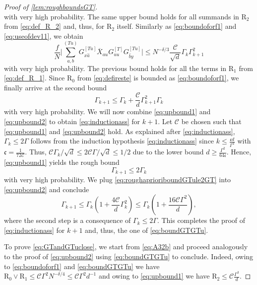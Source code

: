 \documentclass[11pt]{article}
\theoremstyle{plain}
\theoremstyle{remark}
\numberwithin{equation}{section}
\newcommand*\barr[1]{\overline{#1}}
\newcommand*\bset[1]{[#1]}
\newcommand*\ubarr[1]{{\widehat{#1}}}
\begin{document}
\begin{proof}[Proof of \cref{lem:roughboundsGT}]
\begin{equation}
		\end{equation}
		with very high probability. The same upper bound holds for all summands in $\mathrm{R}_2$ from \cref{eq:def_R_2} and, thus, for $\mathrm{R}_2$ itself.  
		Similarly as \cref{eq:boundoforf1} and \cref{eq:useofdev11}, we obtain 
		\begin{equation}\label{eq:upboundforf2}
			\frac{f}{N}\biggl| \sum_{a,b}^{(Tu)} G_{x\ubarr{a}}^{\bset{Tu}} \barr{X}_{au} G_{uu}^{\bset{T}} G_{\ubarr{b}y}^{\bset{Tu}} \biggr| \le N^{- \delta/ 3 }\frac{\mathcal{C}}{\sqrt{d}} \Gamma_k \Gamma_{k+1}^{2}
		\end{equation}
		with very high probability. 
		The previous bound holds for all the terms in $\mathrm{R}_1$ from \cref{eq:def_R_1}. 
		Since $\mathrm{R}_0$ from \cref{eq:defireste} is bounded as \cref{eq:boundoforf1}, 
		we finally arrive at the second bound 
		\begin{equation}\label{eq:upbound2}
			\Gamma_{k+1} \le \Gamma_{k} + \frac{\mathcal{C}}{d} \Gamma_{k+1}^2 \Gamma_k
		\end{equation}
		with very high probability. 
		We will now combine \cref{eq:upbound1} and \cref{eq:upbound2} to obtain \cref{eq:inductionass} for $k + 1$. Let $\mathcal C$ be chosen such that \cref{eq:upbound1} and \cref{eq:upbound2} hold. As explained after \cref{eq:inductionass}, $\Gamma_k \leq  2 \Gamma$ follows from the induction hypothesis \cref{eq:inductionass} since $ k \le \frac{\mathfrak{c} d}{\Gamma^2}$ with $\mathfrak c = \frac{1}{72 \mathcal C}$. 
		Thus, $\mathcal{C}\Gamma_k/\sqrt{d} \le 2\mathcal{C}\Gamma/ \sqrt{d}\le 1/2$ due to the lower bound $d \geq \frac{\Gamma^2}{64\mathfrak c}$. Hence, \cref{eq:upbound1} yields the rough bound 
		\begin{equation}\label{eq:roughaprioriboundGTule2GT}
			\Gamma_{k+1} \le 2 \Gamma_k
		\end{equation}
		with very high probability. We plug \cref{eq:roughaprioriboundGTule2GT} into \cref{eq:upbound2} and conclude 
		\begin{equation*}
			\Gamma_{k+1} \le \Gamma_{k} \left( 1 + \frac{4\mathcal{C}}{d}  \Gamma_{k}^2 \right) \le \Gamma_{k} \left( 1 + \frac{16\mathcal{C}\Gamma^2}{d} \right),
		\end{equation*}
		where the second step is a consequence of $\Gamma_{k} \le 2 \Gamma$.
		This completes the proof of \cref{eq:inductionass} for $k +1$ and, thus, the one of \cref{eq:boundGTGTu}.
		
		To prove \cref{eq:GTandGTuclose}, we start from \cref{eq:A32b} and proceed 
		analogously to the proof of \cref{eq:upbound2} using \cref{eq:boundGTGTu} to conclude. Indeed, owing to \cref{eq:boundoforf1} and \cref{eq:boundGTGTu} we have $\mathrm{R}_0 \vee \mathrm{R}_1 \le \mathcal C \Gamma^ 2 N^{-\delta/4} \le \mathcal C \Gamma^2d^{-1}$ and owing to \cref{eq:upbound1} we have $\mathrm{R}_2 \le \mathcal C \frac{\Gamma^3}{d}$.  
	\end{proof}
	
\end{document}
